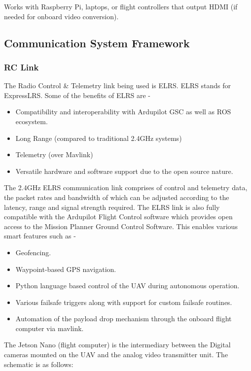\documentclass[12pt]{report}
\begin{document}
Works with Raspberry Pi, laptops, or flight controllers that output HDMI (if needed for onboard video conversion).

\newpage
          \subsection{Communication System Framework}
          \subsubsection{\large RC Link}
            The Radio Control \& Telemetry link being used is ELRS. ELRS stands for ExpressLRS. Some of the benefits of ELRS are -
            \begin{itemize}
              \item Compatibility and interoperability with Ardupilot GSC as well as ROS ecosystem.
              \item Long Range (compared to traditional 2.4GHz systems)
              \item Telemetry (over Mavlink)
              \item Versatile hardware and software support due to the open source nature.
            \end{itemize}

          \noindent The 2.4GHz ELRS communication link comprises of control and telemetry data, the packet rates and bandwidth of which can be adjusted according to the latency, range and signal strength required. The ELRS link is also fully compatible with the Ardupilot Flight Control software which provides open access to the Mission Planner Ground Control Software. This enables various smart features such as -
          \begin{itemize}
            \item Geofencing.
            \item Waypoint-based GPS navigation.
            \item Python language based control of the UAV during autonomous operation.
            \item Various failsafe triggers along with support for custom failsafe routines.
            \item Automation of the payload drop mechanism through the onboard flight computer via mavlink.
          \end{itemize}

          \noindent The Jetson Nano (flight computer) is the intermediary between the Digital cameras mounted on the UAV and the analog video transmitter unit. The schematic is as follows:
\end{document}
